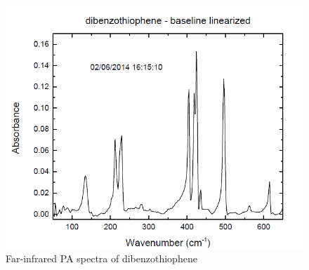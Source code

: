 	
	\begin{figure}[H]
		\centering
		\includegraphics[scale=0.53]{image/image/Spectra-diben}  
		\caption{Far-infrared PA spectra of dibenzothiophene} \label{P1-spectradiben}
	\end{figure}
	
	
	

